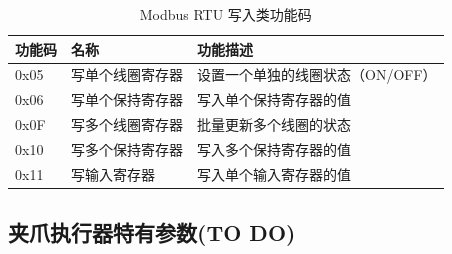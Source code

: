 \documentclass[UTF8]{ctexart}
\begin{document}
        \begin{table}[h]
        \centering
        \caption{Modbus RTU 写入类功能码}
        \label{tab:modbus_rtu_write}
        \begin{tabular}{|l|l|l|}
        \hline
        \textbf{功能码} & \textbf{名称} & \textbf{功能描述} \\ \hline
        0x05 & 写单个线圈寄存器 & 设置一个单独的线圈状态（ON/OFF） \\ \hline
        0x06 & 写单个保持寄存器 & 写入单个保持寄存器的值\\ \hline
        0x0F & 写多个线圈寄存器 & 批量更新多个线圈的状态 \\ \hline
        0x10 & 写多个保持寄存器 & 写入多个保持寄存器的值 \\ \hline
        0x11 & 写输入寄存器 & 写入单个输入寄存器的值 \\ \hline
        \end{tabular}
        \end{table}
\subsection{夹爪执行器特有参数(TO DO)}
\end{document}
